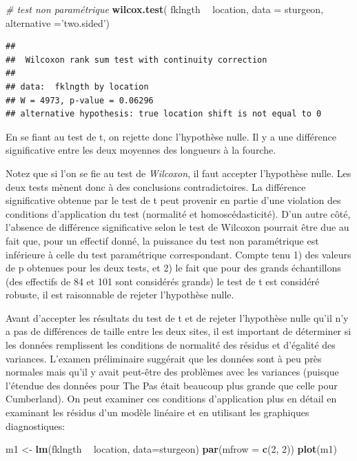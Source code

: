 \documentclass[12pt,]{book}
\newenvironment{Shaded}{\begin{snugshade}}{\end{snugshade}}
\newcommand{\CommentTok}[1]{\textcolor[rgb]{0.37,0.37,0.37}{\textit{#1}}}
\newcommand{\DataTypeTok}[1]{\textcolor[rgb]{0.27,0.27,0.27}{#1}}
\newcommand{\DecValTok}[1]{\textcolor[rgb]{0.06,0.06,0.06}{#1}}
\newcommand{\KeywordTok}[1]{\textcolor[rgb]{0.27,0.27,0.27}{\textbf{#1}}}
\newcommand{\NormalTok}[1]{#1}
\newcommand{\OperatorTok}[1]{\textcolor[rgb]{0.43,0.43,0.43}{\textbf{#1}}}
\newcommand{\StringTok}[1]{\textcolor[rgb]{0.5,0.5,0.5}{#1}}
\begin{document}
\begin{Shaded}
\begin{Highlighting}[]
\CommentTok{# test non paramétrique}
 \KeywordTok{wilcox.test}\NormalTok{(}
\NormalTok{   fklngth }\OperatorTok{~}\StringTok{ }\NormalTok{location, }\DataTypeTok{data =}\NormalTok{ sturgeon,}
   \DataTypeTok{alternative =}\StringTok{'two.sided'}\NormalTok{)}
\end{Highlighting}
\end{Shaded}

\begin{verbatim}
## 
## 	Wilcoxon rank sum test with continuity correction
## 
## data:  fklngth by location
## W = 4973, p-value = 0.06296
## alternative hypothesis: true location shift is not equal to 0
\end{verbatim}

En se fiant au test de t, on rejette donc l'hypothèse nulle. Il y a une différence significative entre les deux moyennes des longueurs à la fourche.

Notez que si l'on se fie au test de \emph{Wilcoxon}, il faut accepter l'hypothèse nulle. Les deux tests mènent donc à des conclusions contradictoires. La différence significative obtenue par le test de t peut provenir en partie d'une violation des conditions d'application du test (normalité et homoscédasticité). D'un autre côté, l'absence de différence significative selon le test de Wilcoxon pourrait être due au fait que, pour un effectif donné, la puissance du test non paramétrique est inférieure à celle du test paramétrique correspondant. Compte tenu 1) des valeurs de p obtenues pour les deux tests, et 2) le fait que pour des grands échantillons (des effectifs de 84 et 101 sont considérés grands) le test de t est considéré robuste, il est raisonnable de rejeter l'hypothèse nulle.

Avant d'accepter les résultats du test de t et de rejeter l'hypothèse nulle qu'il n'y a pas de différences de taille entre les deux sites, il est important de déterminer si les données remplissent les conditions de normalité des résidus et d'égalité des variances. L'examen préliminaire suggérait que les données sont à peu près normales mais qu'il y avait peut-être des problèmes avec les variances (puisque l'étendue des données pour The Pas était beaucoup plus grande que celle pour Cumberland). On peut examiner ces conditions d'application plus en détail en examinant les résidus d'un modèle linéaire et en utilisant les graphiques diagnostiques:

\begin{Shaded}
\begin{Highlighting}[]
\NormalTok{m1 <-}\StringTok{ }\KeywordTok{lm}\NormalTok{(fklngth }\OperatorTok{~}\StringTok{ }\NormalTok{location, }\DataTypeTok{data=}\NormalTok{sturgeon)}
\KeywordTok{par}\NormalTok{(}\DataTypeTok{mfrow =} \KeywordTok{c}\NormalTok{(}\DecValTok{2}\NormalTok{, }\DecValTok{2}\NormalTok{))}
\KeywordTok{plot}\NormalTok{(m1)}
\end{Highlighting}
\end{Shaded}
\end{document}

